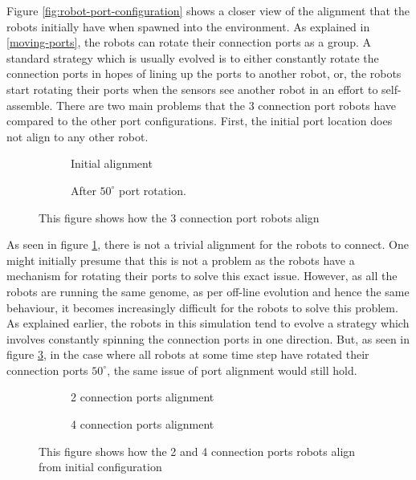 Figure \ref{fig:robot-port-configuration} shows a closer view of the alignment that the robots initially have when spawned into the environment.
As explained in \ref{moving-ports}, the robots can rotate their connection ports as a group.
A standard strategy which is usually evolved is to either constantly rotate the connection ports in hopes of lining up the ports to another robot, or, the robots start rotating their ports when the sensors see another robot in an effort to self-assemble.
There are two main problems that the 3 connection port robots have compared to the other port configurations.
First, the initial port location does not align to any other robot.


\begin{figure}[H]
	\begin{subfigure}[t]{0.49\textwidth}
		\centering
		\caption{Initial alignment}
		\label{3-port-guided-allignment}
	\end{subfigure}
	\begin{subfigure}[t]{0.49\textwidth}
		\centering
		\caption{After $50^{\circ}$ port rotation.}
		\label{3-port-guided-allignment-offset}
	\end{subfigure}
	\caption{This figure shows how the 3 connection port robots align}
\end{figure}


As seen in figure \ref{3-port-guided-allignment}, there is not a trivial alignment for the robots to connect.
One might initially presume that this is not a problem as the robots have a mechanism for rotating their ports to solve this exact issue.
However, as all the robots are running the same genome, as per off-line evolution and hence the same behaviour, it becomes increasingly difficult for the robots to solve this problem.
As explained earlier, the robots in this simulation tend to evolve a strategy which involves constantly spinning the connection ports in one direction.
But, as seen in figure \ref{3-port-guided-allignment-offset}, in the case where all robots at some time step have rotated their connection ports $50^{\circ}$, the same issue of port alignment would still hold.

\begin{figure}[H]
	\begin{subfigure}[t]{0.49\textwidth}
		\centering
		\caption{2 connection ports alignment}
		\label{2-port-guided-allignment}
	\end{subfigure}
	\begin{subfigure}[t]{0.49\textwidth}
		\centering
		\caption{4 connection ports alignment}
		\label{4-port-guided-allignment}
	\end{subfigure}
	\caption{This figure shows how the 2 and 4 connection ports robots align from initial configuration}
	\label{2-4-port-guided-allignment}
\end{figure}

